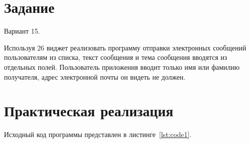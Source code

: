\documentclass[a4paper, 14pt]{extarticle}
\begin{document}
\renewcommand{\ttdefault}{pcr}

\setlength{\tabcolsep}{3pt}
\newpage
\setcounter{page}{2}

\section{Задание}\label{Sect::task}

Вариант 15.

Используя 26 виджет реализовать программу отправки электронных сообщений пользователям из списка, текст сообщения и тема сообщения вводятся из отдельных полей. Пользователь приложения вводит только имя или фамилию получателя, адрес электронной почты он видеть не должен.

\section{Практическая реализация}\label{Sect::code}

Исходный код программы представлен в листинге~\ref{lst:code1}.
\end{document}

